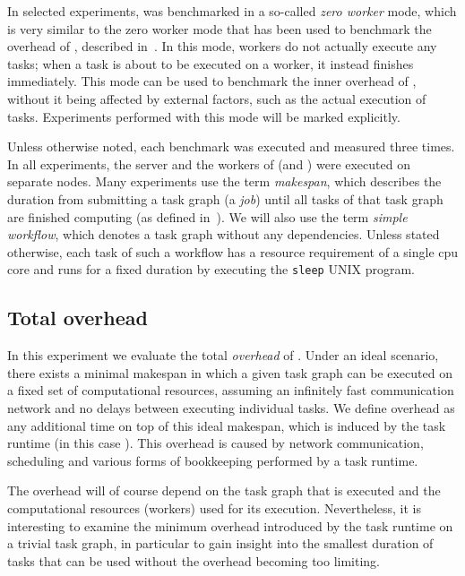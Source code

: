 In selected experiments, \hq{} was benchmarked in a so-called
\emph{zero worker} mode, which is very similar to the zero worker mode that has been used to
benchmark the overhead of \rsds{}, described in~. In this
mode, workers do not actually execute any tasks; when a task is about to be executed on a worker,
it instead finishes immediately. This mode can be used to benchmark the inner overhead of
\hyperqueue{}, without it being affected by external factors, such as the actual
execution of tasks. Experiments performed with this mode will be marked explicitly.

Unless otherwise noted, each benchmark was executed and measured three times. In all experiments,
the server and the workers of \hyperqueue{} (and \dask{}) were executed on separate nodes. Many
experiments use the term \emph{makespan}, which describes the duration from submitting a
task graph (a \hyperqueue{} \emph{job}) until all tasks of that task graph
are finished computing (as defined in~). We will also use the term
\emph{simple workflow}, which denotes a task graph without any dependencies. Unless stated
otherwise, each task of such a workflow has a resource requirement of a single
\gls{cpu} core and runs for a fixed duration by executing the \texttt{sleep}
UNIX program.

\subsection{Total overhead}
\label{sec:hq-exp-total-overhead}
In this experiment we evaluate the total \emph{overhead} of \hyperqueue{}. Under
an ideal scenario, there exists a minimal makespan in which a given task graph can be executed on a
fixed set of computational resources, assuming an infinitely fast communication network and no
delays between executing individual tasks. We define overhead as any additional time on top of this
ideal makespan, which is induced by the task runtime (in this case \hyperqueue{}). This
overhead is caused by network communication, scheduling and various forms of bookkeeping
performed by a task runtime.

The overhead will of course depend on the task graph that is executed and the computational
resources (workers) used for its execution. Nevertheless, it is interesting to examine the minimum
overhead introduced by the task runtime on a trivial task graph, in particular to gain insight into
the smallest duration of tasks that can be used without the overhead becoming too limiting.

